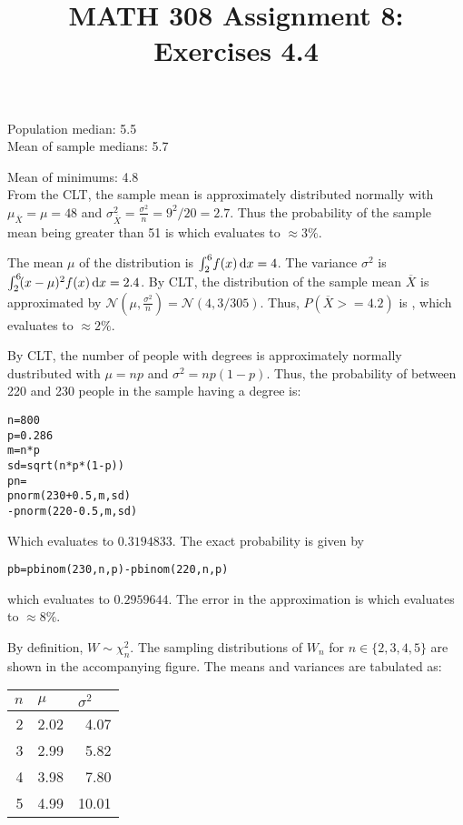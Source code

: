\documentclass[twocolumn]{article}
\title{MATH 308 Assignment 8:\\Exercises 4.4}
\newcommand{\sm}[1]{\mu_{\overline{#1}}}
\newcommand{\sv}[1]{\sigma^2_{\overline{#1}}}
\begin{document}
\maketitle

\noindent Population median: 5.5\\
Mean of sample medians: 5.7

\newpage

\noindent Mean of minimums: 4.8\\


From the CLT, the sample mean is approximately distributed normally with $\sm{X}=\mu=48$ and $\sv{X}=\frac{\sigma^2}{n}=9^2/20=2.7$. Thus the probability of the sample mean being greater than 51 is  which evaluates to $\approx 3\%.$

The mean $\mu$ of the distribution is $\int_{2}^{6} \! f(x) \, \mathrm{d} x=4$. The variance $\sigma^2$ is $\int_{2}^{6} \! (x-\mu)^2f(x) \, \mathrm{d} x=2.4$. By CLT, the distribution of the sample mean $\overline{X}$ is approximated by $\mathcal{N}(\mu,\frac{\sigma^2}{n})=\mathcal{N}(4,3/305)$. Thus, $P(\overline{X}>=4.2)$ is , which evaluates to $\approx 2\%$.

By CLT, the number of people with degrees is approximately normally dustributed with $\mu=np$ and $\sigma^2=np(1-p)$. Thus, the probability of between 220 and 230 people in the sample having a degree is: \begin{lstlisting}
n=800
p=0.286
m=n*p
sd=sqrt(n*p*(1-p))
pn=
pnorm(230+0.5,m,sd)
-pnorm(220-0.5,m,sd)
\end{lstlisting}
Which evaluates to $0.3194833$. The exact probability is given by \begin{lstlisting}
pb=pbinom(230,n,p)-pbinom(220,n,p)
\end{lstlisting} which evaluates to $0.2959644$. The error in the approximation is  which evaluates to $\approx 8\%$.


By definition, $W \sim \chi_n^2$. The sampling distributions of $W_n$ for $n\in\{2,3,4,5\}$ are shown in the accompanying figure.
The means and variances are tabulated as:
\begin{table}[h]
\centering
\begin{tabular}{@{}rrr@{}}
\toprule
\multicolumn{1}{l}{$n$} & \multicolumn{1}{l}{$\mu$} & \multicolumn{1}{l}{$\sigma^2$} \\ \midrule
2                     & 2.02                  & 4.07                  \\
3                     & 2.99                  & 5.82                  \\
4                     & 3.98                  & 7.80                  \\
5                     & 4.99                  & 10.01                 \\ \bottomrule
\end{tabular}
\end{table}
\end{document}
